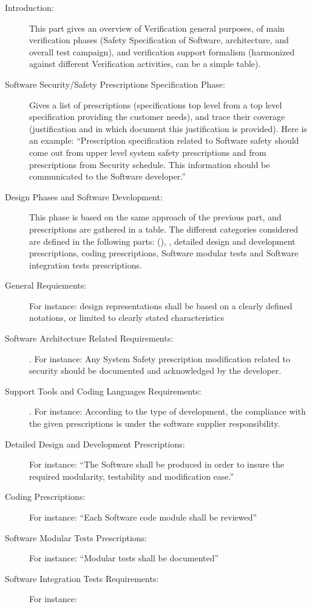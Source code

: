 \documentclass{template/openetcs_report}
\begin{document}
\begin{description}
\item[Introduction:] This part gives an overview of Verification
  general purposes, of main verification phases (Safety Specification
  of Software, architecture, and overall test campaign), and
  verification support formalism (harmonized against different
  Verification activities, can be a simple table).
\item[ Software Security/Safety Prescriptions Specification Phase:]
  Gives a list of prescriptions (specifications top level from a top
  level specification providing the customer needs), and trace their
  coverage (justification and in which document this justification is
  provided).  Here is an example: “Prescription specification related
  to Software safety should come out from upper level system safety
  prescriptions and from prescriptions from Security schedule.  This
  information should be communicated to the Software developer.”
\item[Design Phases and Software Development:] This phase is based on
  the same approach of the previous part, and prescriptions are
  gathered in a table.  The different categories considered are
  defined in the following parts: (), , detailed design and
  development prescriptions, coding prescriptions, Software modular
  tests and Software integration tests prescriptions.
\item[General Requiements:] For instance: design representations shall
  be based on a clearly defined notations, or limited to clearly
  stated characteristics
\item[Software Architecture Related Requirements:]. For instance: Any
  System Safety prescription modification related to security should
  be documented and acknowledged by the developer.
\item[Support Tools and Coding Languages Requirements:]. For instance:
  According to the type of development, the compliance with the given
  prescriptions is under the software supplier responsibility.
\item[Detailed Design and Development Prescriptions:] For instance:
  ``The Software shall be produced in order to insure the required
  modularity, testability and modification ease.''
\item[Coding Prescriptions:] For instance: ``Each Software code
  module shall be reviewed''
\item[Software Modular Tests Prescriptions:] For instance: ``Modular
  tests shall be documented''
\item[Software Integration Tests Requirements:] For instance:

\end{description}
\end{document}
